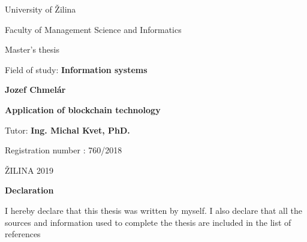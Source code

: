 
\begin{titlepage}

\begin{center}

{\sc\LARGE University of Žilina}

\medskip

{\sc\Large Faculty of Management Science and Informatics}

\vfill\vfill\vfill\vfill

{\sc\LARGE Master's thesis}

\smallskip

{\large Field of study: {\bf Information systems}}

\end{center}

\vfill\vfill\vfill

\begin{center}
    
{\large\bf Jozef Chmelár}

\smallskip

{\large\bf Application of blockchain technology}

\smallskip

Tutor: {\bf Ing. Michal Kvet, PhD. }

\smallskip

Registration number : 760/2018	

\smallskip

ŽILINA 2019

\end{center}

\end{titlepage}


\pagebreak
\hfill
\vfill

\begin{center}

\sc\Large\textbf{Declaration}

\end{center}

I hereby declare that this thesis was written by myself. I also declare that all the sources and information used  to complete the thesis are included in the list of references

\vspace{1em}

